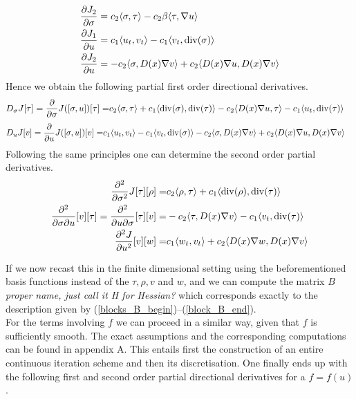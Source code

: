 \documentclass[../draft_1.tex]{subfiles}
\begin{document}
\begin{align}
\frac{\partial J_2}{\partial \sigma} &= c_2 \langle \sigma, \tau \rangle - c_2 \beta \langle \tau, \nabla u \rangle \\
\frac{\partial J_1}{\partial u} &= c_1 \langle u_t, v_t \rangle - c_1 \langle v_t, \mathop{}\!\mathrm{div}(\sigma) \rangle \\
\frac{\partial J_2}{\partial u} &= - c_2 \langle \sigma, D(x) \nabla v \rangle + c_2 \langle D(x) \nabla u, D(x) \nabla v \rangle
\end{align}
Hence we obtain the following partial first order directional derivatives. 
\begin{equation}
\begin{aligned}
D_{\sigma} J [\tau] = \frac{\partial}{\partial \sigma}J([\sigma, u])[\tau] =& c_2 \langle \sigma, \tau \rangle + c_1 \langle \mathop{}\!\mathrm{div}(\sigma), \mathop{}\!\mathrm{div}(\tau) \rangle - c_2 \langle D(x) \nabla u, \tau \rangle - c_1 \langle u_t, \mathop{}\!\mathrm{div}(\tau) \rangle 
\end{aligned}
\end{equation}
\begin{equation}
\begin{aligned}
D_u J [v]= \frac{\partial}{\partial u} J([\sigma, u])[v] =&  c_1 \langle u_t, v_t \rangle - c_1 \langle v_t, \mathop{}\!\mathrm{div}(\sigma) \rangle - c_2 \langle \sigma, D(x) \nabla v \rangle + c_2 \langle D(x) \nabla u, D(x) \nabla v \rangle
\end{aligned}
\end{equation}
Following the same principles one can determine the second order partial derivatives.  
\begin{align}
\begin{aligned}
\frac{\partial^2}{\partial \sigma^2} J [\tau] [\rho] =& c_2 \langle \rho, \tau \rangle + c_1 \langle \mathop{}\!\mathrm{div}(\rho), \mathop{}\!\mathrm{div}(\tau) \rangle  \\
\frac{\partial^2}{\partial \sigma \partial u} [v][\tau] = \frac{\partial^2 }{\partial u \partial \sigma} [\tau] [v]=& - c_2 \langle \tau, D(x) \nabla v \rangle - c_1 \langle v_t, \mathop{}\!\mathrm{div}(\tau) \rangle \\
\frac{\partial^2 J}{\partial u^2} [v][w] =& c_1 \langle w_t, v_t \rangle + c_2 \langle D(x) \nabla w, D(x) \nabla v \rangle
\end{aligned}
\end{align}

If we now recast this in the finite dimensional setting using the beforementioned basis functions instead of the $\tau, \rho, v$ and $w$, and we can compute the matrix $B$ \textit{proper name, just call it H for Hessian?} which corresponds exactly to the description given by (\ref{blocks_B_begin})--(\ref{block_B_end}). 
\smallskip
\\
For the terms involving $f$ we can proceed in a similar way, given that $f$ is sufficiently smooth. The exact assumptions and the corresponding computations can be found in appendix A. This entails first the construction of an entire continuous iteration scheme and then its discretisation. One finally ends up with the following first and second order partial directional derivatives for a $f=f(u)$.
\end{document}
